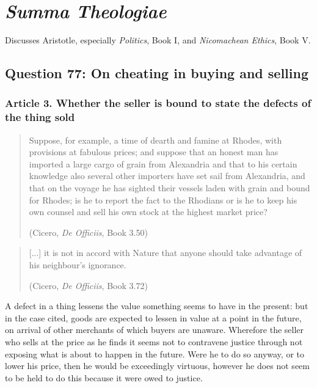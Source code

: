 \section{\textit{Summa Theologiae}}

    \begin{remark}
        Discusses Aristotle, especially \textit{Politics}, Book I, and \textit{Nicomachean Ethics}, Book V.
    \end{remark}

        \subsection{Question 77: On cheating in buying and selling}

            \subsubsection{Article 3. Whether the seller is bound to state the defects of the thing sold}

                \begin{quote}

                    Suppose, for example, a time of dearth and famine at Rhodes, with provisions at fabulous prices; and suppose that an honest man has imported a large cargo of grain from Alexandria and that to his certain knowledge also several other importers have set sail from Alexandria, and that on the voyage he has sighted their vessels laden with grain and bound for Rhodes; is he to report the fact to the Rhodians or is he to keep his own counsel and sell his own stock at the highest market price?

                    (Cicero, \textit{De Officiis}, Book 3.50)
                \end{quote}


                \begin{quote}
                    [...] it is not in accord with Nature that anyone should take advantage of his neighbour’s ignorance.

                    (Cicero, \textit{De Officiis}, Book 3.72)
                \end{quote}

                A defect in a thing lessens the value something seems to have in the present: but in the case cited, goods are expected to lessen in value at a point in the future, on arrival of other merchants of which buyers are unaware. Wherefore the seller who sells at the price as he finds it seems not to contravene justice through not exposing what is about to happen in the future. Were he to do so anyway, or to lower his price, then he would be exceedingly virtuous, however he does not seem to be held to do this because it were owed to justice.

